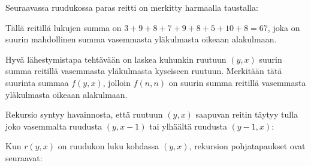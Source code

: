 Seuraavassa ruudukossa paras reitti
on merkitty harmaalla taustalla:
\\
\begin{center}
\end{center}

Tällä reitillä lukujen summa on $3+9+8+7+9+8+5+10+8=67$,
joka on suurin mahdollinen summa vasemmasta yläkulmasta
oikeaan alakulmaan.

Hyvä lähestymistapa tehtävään on laskea
kuhunkin ruutuun $(y,x)$ suurin summa
reitillä vasemmasta yläkulmasta kyseiseen ruutuun.
Merkitään tätä suurinta summaa $f(y,x)$,
jolloin $f(n,n)$ on suurin summa
reitillä vasemmasta yläkulmasta oikeaan alakulmaan.

Rekursio syntyy havainnosta,
että ruutuun $(y,x)$ saapuvan reitin
täytyy tulla joko vasemmalta ruudusta $(y,x-1)$
tai ylhäältä ruudusta $(y-1,x)$:
\\
\begin{center}
\end{center}

Kun $r(y,x)$
on ruudukon luku kohdassa $(y,x)$,
rekursion pohjatapaukset ovat seuraavat:

